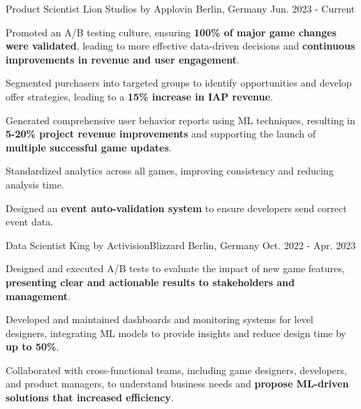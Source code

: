 
\begin{cventries}

\cventry
  {Product Scientist} %
  {Lion Studios by Applovin} %
  {Berlin, Germany} %
  {Jun. 2023 - Current} %
  {
    \begin{cvitems} %
      \item {Promoted an A/B testing culture, ensuring \textbf{100\% of major game changes were validated}, leading to more effective data-driven decisions and \textbf{continuous improvements in revenue and user engagement}.}
      \item {Segmented purchasers into targeted groups to identify opportunities and develop offer strategies, leading to a \textbf{15\% increase in IAP revenue}.}
      \item {Generated comprehensive user behavior reports using ML techniques, resulting in \textbf{5-20\% project revenue improvements} and supporting the launch of \textbf{multiple successful game updates}.}
      \item {Standardized analytics across all games, improving consistency and reducing analysis time.}
      \item {Designed an \textbf{event auto-validation system} to ensure developers send correct event data.}
    \end{cvitems}
  }

\cventry
  {Data Scientist} %
  {King by ActivisionBlizzard} %
  {Berlin, Germany} %
  {Oct. 2022 - Apr. 2023} %
  {
    \begin{cvitems} %
      \item {Designed and executed A/B tests to evaluate the impact of new game features, \textbf{presenting clear and actionable results to stakeholders and management}.}
      \item {Developed and maintained dashboards and monitoring systems for level designers, integrating ML models to provide insights and reduce design time by \textbf{up to 50\%}.}
      \item {Collaborated with cross-functional teams, including game designers, developers, and product managers, to understand business needs and \textbf{propose ML-driven solutions that increased efficiency}.}
    \end{cvitems}
  }


\end{cventries}
